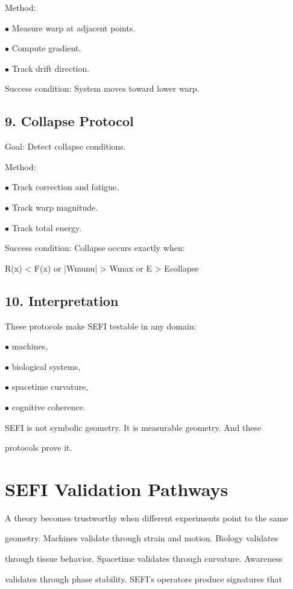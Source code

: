 \documentclass[10pt]{article}
\begin{document}
Method:

\noindent $\bullet$ Measure warp at adjacent points.

\noindent $\bullet$ Compute gradient.

\noindent $\bullet$ Track drift direction.

Success condition: System moves toward lower warp.


\subsection*{9. Collapse Protocol}
Goal: Detect collapse conditions.

Method:

\noindent $\bullet$ Track correction and fatigue.

\noindent $\bullet$ Track warp magnitude.

\noindent $\bullet$ Track total energy.

Success condition: Collapse occurs exactly when:

R(x) < F(x) or |Wmunu| > Wmax or E > Ecollapse

\subsection*{10. Interpretation}
These protocols make SEFI testable in any domain:

\noindent $\bullet$ machines,

\noindent $\bullet$ biological systems,

\noindent $\bullet$ spacetime curvature,

\noindent $\bullet$ cognitive coherence.

SEFI is not symbolic geometry. It is measurable geometry. And these

protocols prove it.

\section*{SEFI Validation Pathways}
A theory becomes trustworthy when different experiments point to the same

geometry. Machines validate through strain and motion. Biology validates

through tissue behavior. Spacetime validates through curvature. Awareness

validates through phase stability. SEFI's operators produce signatures that
\end{document}
